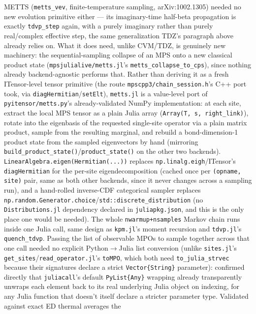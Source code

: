 \documentclass[11pt]{article}
\begin{document}
METTS (\texttt{metts\_vev}, finite-temperature sampling, arXiv:1002.1305)
needed no new evolution primitive either --- its imaginary-time half-beta
propagation is exactly \texttt{tdvp\_step} again, with a purely
imaginary rather than purely real/complex effective step, the same
generalization TDZ's paragraph above already relies on. What it does
need, unlike CVM/TDZ, is genuinely new machinery: the sequential-sampling
collapse of an MPS onto a new classical product state
(\texttt{mpsjulialive/metts.jl}'s \texttt{metts\_collapse\_to\_cps}),
since nothing already backend-agnostic performs that. Rather than
deriving it as a fresh ITensor-level tensor primitive (the route
\texttt{mpscpp3/chain\_session.h}'s C++ port took, via
\texttt{diagHermitian}/\texttt{setElt}), \texttt{metts.jl} is a
value-level port of \texttt{pyitensor/metts.py}'s already-validated NumPy
implementation: at each site, extract the local MPS tensor as a plain
Julia array (\texttt{Array(T, s, right\_link)}), rotate into the
eigenbasis of the requested single-site operator via a plain matrix
product, sample from the resulting marginal, and rebuild a
bond-dimension-1 product state from the sampled eigenvectors by hand
(mirroring \texttt{build\_product\_state()}/\texttt{product\_state()} on
the other two backends). \texttt{LinearAlgebra.eigen(Hermitian(...))}
replaces \texttt{np.linalg.eigh}/ITensor's \texttt{diagHermitian} for the
per-site eigendecomposition (cached once per \texttt{(opname, site)}
pair, same as both other backends, since it never changes across a
sampling run), and a hand-rolled inverse-CDF categorical sampler replaces
\texttt{np.random.Generator.choice}/\texttt{std::discrete\_distribution}
(no \texttt{Distributions.jl} dependency declared in
\texttt{juliapkg.json}, and this is the only place one would be needed).
The whole \texttt{nwarmup+nsamples} Markov chain runs inside one Julia
call, same design as \texttt{kpm.jl}'s moment recursion and
\texttt{tdvp.jl}'s \texttt{quench\_tdvp}. Passing the list of observable
MPOs to sample together across that one call needed no explicit
Python$\to$Julia list conversion (unlike \texttt{sites.jl}'s
\texttt{get\_sites}/\texttt{read\_operator.jl}'s \texttt{toMPO}, which
both need \texttt{to\_julia\_strvec} because their signatures declare a
strict \texttt{Vector\{String\}} parameter): confirmed directly that
\texttt{juliacall}'s default \texttt{PyList\{Any\}} wrapping already
transparently unwraps each element back to its real underlying Julia
object on indexing, for any Julia function that doesn't itself declare a
stricter parameter type. Validated against exact ED thermal averages the
\end{document}
